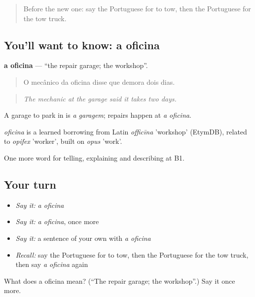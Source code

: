 \label{lesson:PT-C406-oficina}



\begin{quote}
Before the new one: say the Portuguese for to tow, then the Portuguese for the tow truck.
\end{quote}

\subsection*{You'll want to know: a oficina}
\textbf{a oficina} — \textquotedblleft{}the repair garage; the workshop\textquotedblright{}.

\begin{quote}
O mecânico da oficina disse que demora dois dias.
\end{quote}

\begin{quote}
\emph{The mechanic at the garage said it takes two days.}
\end{quote}

A garage to park in is \emph{a garagem}; repairs happen at \emph{a oficina}.

\begin{cousinweb}
\emph{oficina} is a learned borrowing from Latin \emph{officīna} 'workshop' (EtymDB), related to \emph{opifex} 'worker', built on \emph{opus} 'work'.
\end{cousinweb}

\begin{grammarlens}[title={What you've built}]
One more word for telling, explaining and describing at B1.
\end{grammarlens}

\subsection*{Your turn}
\begin{itemize}
\raggedright
  \item \emph{Say it:} \emph{a oficina}
  \item \emph{Say it:} \emph{a oficina}, once more
  \item \emph{Say it:} a sentence of your own with \emph{a oficina}
  \item \emph{Recall:} say the Portuguese for to tow, then the Portuguese for the tow truck, then say \emph{a oficina} again
\end{itemize}

\begin{tcolorbox}[breakable,colback=teal!4,colframe=teal!35!black,title={Before you move on}]
What does a oficina mean? (\textquotedblleft{}The repair garage; the workshop\textquotedblright{}.) Say it once more.
\end{tcolorbox}
